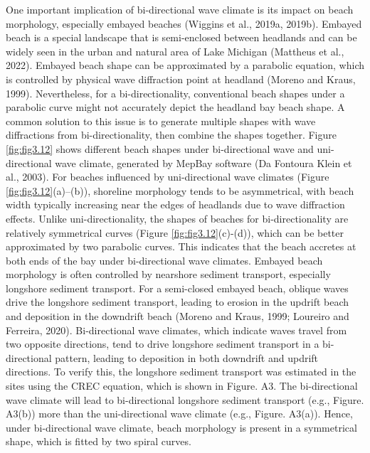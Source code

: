 One important implication of bi-directional wave climate is its impact on beach morphology, especially embayed beaches (Wiggins et al., 2019a, 2019b). Embayed beach is a special landscape that is semi-enclosed between headlands and can be widely seen in the urban and natural area of Lake Michigan (Mattheus et al., 2022). Embayed beach shape can be approximated by a parabolic equation, which is controlled by physical wave diffraction point at headland (Moreno and Kraus, 1999). Nevertheless, for a bi-directionality, conventional beach shapes under a parabolic curve might not accurately depict the headland bay beach shape. A common solution to this issue is to generate multiple shapes with wave diffractions from bi-directionality, then combine the shapes together. Figure \ref{fig:fig3.12} shows different beach shapes under bi-directional wave and uni-directional wave climate, generated by MepBay software (Da Fontoura Klein et al., 2003). For beaches influenced by uni-directional wave climates (Figure \ref{fig:fig3.12}(a)–(b)), shoreline morphology tends to be asymmetrical, with beach width typically increasing near the edges of headlands due to wave diffraction effects. Unlike uni-directionality, the shapes of beaches for bi-directionality are relatively symmetrical curves (Figure \ref{fig:fig3.12}(c)-(d)), which can be better approximated by two parabolic curves. This indicates that the beach accretes at both ends of the bay under bi-directional wave climates. Embayed beach morphology is often controlled by nearshore sediment transport, especially longshore sediment transport. For a semi-closed embayed beach, oblique waves drive the longshore sediment transport, leading to erosion in the updrift beach and deposition in the downdrift beach (Moreno and Kraus, 1999; Loureiro and Ferreira, 2020). Bi-directional wave climates, which indicate waves travel from two opposite directions, tend to drive longshore sediment transport in a bi-directional pattern, leading to deposition in both downdrift and updrift directions. To verify this, the longshore sediment transport was estimated in the sites using the CREC equation, which is shown in Figure. A3. The bi-directional wave climate will lead to bi-directional longshore sediment transport (e.g., Figure. A3(b)) more than the uni-directional wave climate (e.g., Figure. A3(a)). Hence, under bi-directional wave climate, beach morphology is present in a symmetrical shape, which is fitted by two spiral curves. 

